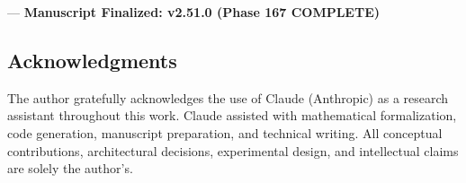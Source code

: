 ---
\textbf{Manuscript Finalized: v2.51.0 (Phase 167 COMPLETE)}

\subsection{Acknow\-ledgments}

The author gratefully ackno\-wledges the use of Claude (Anthropic) as a research assistant throughout this work. Claude assisted with mathe\-matical forma\-lization, code generation, manuscript preparation, and technical writing. All conceptual contr\-ibutions, archi\-tectural decisions, exper\-imental design, and intel\-lectual claims are solely the author's.

